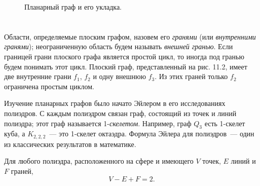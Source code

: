 \begin{figure}[h]
    \caption{Планарный граф и его укладка.}
\end{figure}

\section*{} %

Области, определяемые плоским графом, назовем его \textit{гранями} (или \textit{внутренними гранями}); неограниченную область будем называть \textit{внешней гранью}. Если границей грани плоского графа является простой цикл, то иногда под гранью будем понимать этот цикл. Плоский граф, представленный на рис. 11.2, имеет две внутренние грани $f_1$, $f_2$ и одну внешнюю $f_3$. Из этих граней только $f_2$ ограничена простым циклом.

Изучение планарных графов было начато Эйлером в его исследованиях полиэдров. С каждым полиэдром связан граф, состоящий из точек и линий полиэдра; этот граф называется 1-\textit{скелетом}. Например, граф $Q_3$ есть 1-скелет куба, а $K_{2,2,2}$~--- это 1-скелет октаэдра. Формула Эйлера для полиэдров~--- один из классических результатов в математике.

\begin{theorem} \label{thm:11.1}
Для любого полиэдра, расположенного на сфере и имеющего $V$ точек, $E$ линий и $F$ граней,
\begin{equation} \label{eq:11.1}
V-E+F=2.
\end{equation}
\end{theorem}

